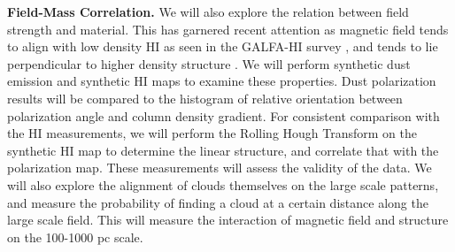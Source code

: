 \noindent
{\bf Field-Mass Correlation.}
We will also explore the relation between field strength and material.  This has
garnered recent attention as magnetic field tends to align with low density HI
as seen in the GALFA-HI survey  \citep{Clark14}, and tends to lie perpendicular
to higher density structure \citep{PlanckXXXII14}.  We will perform synthetic dust
emission and synthetic HI maps to examine these properties.  Dust polarization
results will be compared to the histogram of relative orientation between
polarization angle and column density gradient. For consistent comparison with
the HI measurements, we will perform the Rolling Hough Transform \citep{Clark14} on the
synthetic HI map to determine the linear structure, and correlate that with the
polarization map.  These measurements will assess the validity of the data.  We
will also explore the alignment of clouds themselves on the large scale
patterns, and measure the probability of finding a cloud at a certain distance
along the large scale field.  This will measure the interaction of magnetic
field and structure on the 100-1000 pc scale.



